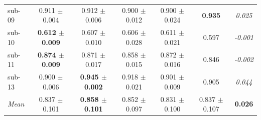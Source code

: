 \begin{table}[t]
\begin{tabular}{lcccccc}
sub-09 & 0.911 $\pm$ 0.004 & 0.912 $\pm$ 0.006 & 0.900 $\pm$ 0.012 & 0.900 $\pm$ 0.024 & \textbf{0.935} & \textit{0.025} \\
sub-10 & \textbf{0.612 $\pm$ 0.009} & 0.607 $\pm$ 0.010 & 0.606 $\pm$ 0.028 & 0.611 $\pm$ 0.021 & 0.597 & \textit{-0.001} \\
sub-11 & \textbf{0.874 $\pm$ 0.009} & 0.871 $\pm$ 0.017 & 0.858 $\pm$ 0.015 & 0.872 $\pm$ 0.016 & 0.846 & \textit{-0.002} \\
sub-13 & 0.900 $\pm$ 0.006 & \textbf{0.945 $\pm$ 0.002} & 0.918 $\pm$ 0.021 & 0.901 $\pm$ 0.009 & 0.905 & \textit{0.044} \\
\midrule
\textit{Mean} & 0.837 $\pm$ 0.101 & \textbf{0.858 $\pm$ 0.101} & 0.852 $\pm$ 0.097 & 0.831 $\pm$ 0.100 & 0.837 $\pm$ 0.107 & \textbf{0.026} \\
\bottomrule
\end{tabular}
\end{table}

